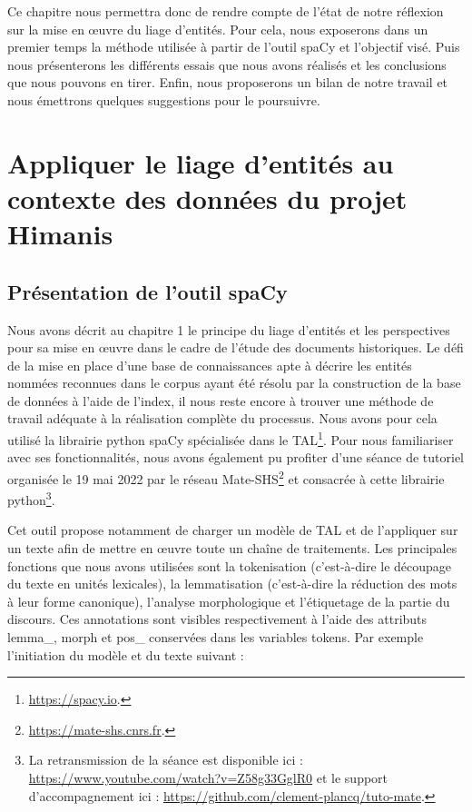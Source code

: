 \documentclass[a4paper,12pt,twoside]{book}
\begin{document}
	Ce chapitre nous permettra donc de rendre compte de l'état de notre réflexion sur la mise en œuvre du liage d'entités. Pour cela, nous exposerons dans un premier temps la méthode utilisée à partir de l'outil spaCy et l'objectif visé. Puis nous présenterons les différents essais que nous avons réalisés et les conclusions que nous pouvons en tirer. Enfin, nous proposerons un bilan de notre travail et nous émettrons quelques suggestions pour le poursuivre.
	
	\section{Appliquer le liage d'entités au contexte des données du projet Himanis}
	
	\subsection{Présentation de l'outil spaCy}
	
	Nous avons décrit au chapitre 1 le principe du liage d'entités et les perspectives pour sa mise en œuvre dans le cadre de l'étude des documents historiques. Le défi de la mise en place d'une base de connaissances apte à décrire les entités nommées reconnues dans le corpus ayant été résolu par la construction de la base de données à l'aide de l'index, il nous reste encore à trouver une méthode de travail adéquate à la réalisation complète du processus. Nous avons pour cela utilisé la librairie python spaCy spécialisée dans le TAL\footnote{\url{https://spacy.io}.}. Pour nous familiariser avec ses fonctionnalités, nous avons également pu profiter d'une séance de tutoriel organisée le 19 mai 2022 par le réseau Mate-SHS\footnote{\url{https://mate-shs.cnrs.fr}.} et consacrée à cette librairie python\footnote{La retransmission de la séance est disponible ici : \url{https://www.youtube.com/watch?v=Z58g33GglR0} et le support d'accompagnement ici : \url{https://github.com/clement-plancq/tuto-mate}.}.
	
	Cet outil propose notamment de charger un modèle de TAL et de l'appliquer sur un texte afin de mettre en œuvre toute un chaîne de traitements. Les principales fonctions que nous avons utilisées sont la tokenisation (c'est-à-dire le découpage du texte en unités lexicales), la lemmatisation (c'est-à-dire la réduction des mots à leur forme canonique), l'analyse morphologique et l'étiquetage de la partie du discours. Ces annotations sont visibles respectivement à l'aide des attributs \og lemma\_\fg{}, \og morph\fg{} et \og pos\_\fg{} conservées dans les variables tokens. Par exemple l'initiation du modèle et du texte suivant :
	
\end{document}
